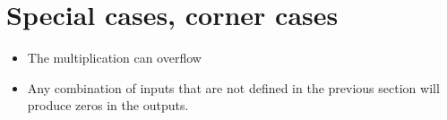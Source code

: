 \section{Special cases, corner cases}

\begin{itemize}
  \item The multiplication can overflow
  \item Any combination of inputs that are not defined in the previous section will produce zeros in the outputs.
\end{itemize}
